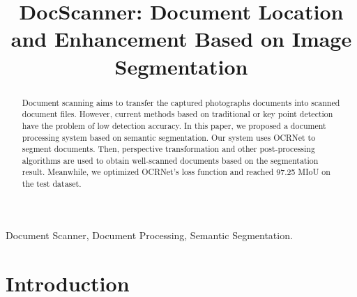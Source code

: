 \documentclass[10pt, conference, compsocconf]{IEEEtran}
\begin{document}
%
\title{DocScanner: Document Location and Enhancement Based on Image Segmentation}

\author{
}
\maketitle
\begin{abstract}

Document scanning aims to transfer the captured photographs documents into scanned document files. 
However, current methods based on traditional or key point detection have the problem of low detection accuracy.
In this paper, we proposed a document processing system based on semantic segmentation.
Our system uses OCRNet to segment documents.
Then, perspective transformation and other post-processing algorithms are used to obtain well-scanned documents based on the segmentation result.
Meanwhile, we optimized OCRNet's loss function and reached 97.25 MIoU on the test dataset.

\end{abstract}

\begin{IEEEkeywords}

Document Scanner, Document Processing, Semantic Segmentation.

\end{IEEEkeywords}

\IEEEpeerreviewmaketitle

\section{Introduction}
\end{document}
